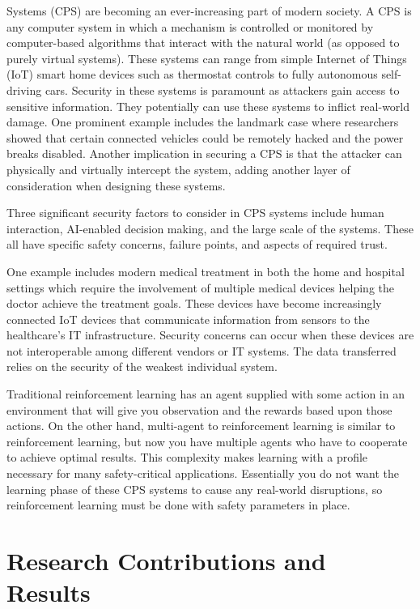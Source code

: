 \documentclass[journal,onecolumn]{IEEEtran}
\begin{document}
 Systems (CPS) are becoming an ever-increasing part of modern society. A CPS is any computer system in which a mechanism is controlled or monitored by computer-based algorithms that interact with the natural world (as opposed to purely virtual systems). These systems can range from simple Internet of Things (IoT) smart home devices such as thermostat controls to fully autonomous self-driving cars. Security in these systems is paramount as attackers gain access to sensitive information. They potentially can use these systems to inflict real-world damage. One prominent example includes the landmark case where researchers showed that certain connected vehicles could be remotely hacked and the power breaks disabled. Another implication in securing a CPS is that the attacker can physically and virtually intercept the system, adding another layer of consideration when designing these systems. 

Three significant security factors to consider in CPS systems include human interaction, AI-enabled decision making, and the large scale of the systems. These all have specific safety concerns, failure points, and aspects of required trust. 

One example includes modern medical treatment in both the home and hospital settings which require the involvement of multiple medical devices
helping the doctor achieve the treatment goals. These devices have become increasingly connected IoT devices that communicate information from sensors to the healthcare's IT infrastructure. Security concerns can occur when these devices are not interoperable among different vendors or IT systems. The data transferred relies on the security of the weakest individual system. 

Traditional reinforcement learning has an agent supplied with some action in an environment that will give you observation and the rewards based upon those actions. On the other hand, multi-agent to reinforcement learning is similar to reinforcement learning, but now you have multiple agents who have to cooperate to achieve optimal results. This complexity makes learning with a profile necessary for many safety-critical applications. Essentially you do not want the learning phase of these CPS systems to cause any real-world disruptions, so reinforcement learning must be done with safety parameters in place. 

\section{Research Contributions and Results}
\end{document}
